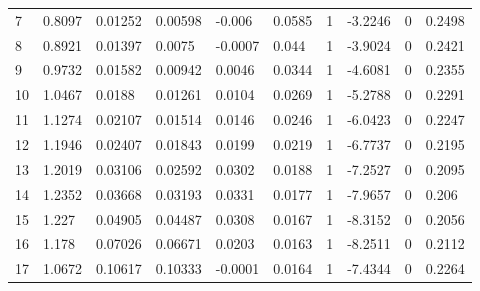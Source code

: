 \begin{singlespace}
\begin{table}[H]
\begin{tabular}{|l|l|l|l|l|l|l|l|l|l|}
7     & 0.8097  & 0.01252 & 0.00598 & -0.006  & 0.0585  & 1       & -3.2246 & 0      & 0.2498 \\
8     & 0.8921  & 0.01397 & 0.0075  & -0.0007 & 0.044   & 1       & -3.9024 & 0      & 0.2421 \\
9     & 0.9732  & 0.01582 & 0.00942 & 0.0046  & 0.0344  & 1       & -4.6081 & 0      & 0.2355 \\
10    & 1.0467  & 0.0188  & 0.01261 & 0.0104  & 0.0269  & 1       & -5.2788 & 0      & 0.2291 \\
11    & 1.1274  & 0.02107 & 0.01514 & 0.0146  & 0.0246  & 1       & -6.0423 & 0      & 0.2247 \\
12    & 1.1946  & 0.02407 & 0.01843 & 0.0199  & 0.0219  & 1       & -6.7737 & 0      & 0.2195 \\
13    & 1.2019  & 0.03106 & 0.02592 & 0.0302  & 0.0188  & 1       & -7.2527 & 0      & 0.2095 \\
14    & 1.2352  & 0.03668 & 0.03193 & 0.0331  & 0.0177  & 1       & -7.9657 & 0      & 0.206  \\
15    & 1.227   & 0.04905 & 0.04487 & 0.0308  & 0.0167  & 1       & -8.3152 & 0      & 0.2056 \\
16    & 1.178   & 0.07026 & 0.06671 & 0.0203  & 0.0163  & 1       & -8.2511 & 0      & 0.2112 \\
17    & 1.0672  & 0.10617 & 0.10333 & -0.0001 & 0.0164  & 1       & -7.4344 & 0      & 0.2264
\end{tabular}
\end{table}


\end{singlespace}
